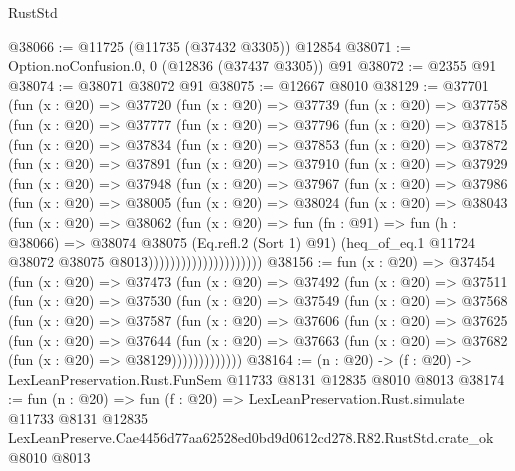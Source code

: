 \begin{lexlean}{RustStd}
\begin{coremodule}
@38066 := @11725 (@11735 (@37432 @3305)) @12854
@38071 := Option.noConfusion.{0, 0} (@12836 (@37437 @3305)) @91
@38072 := @2355 @91
@38074 := @38071 @38072 @91
@38075 := @12667 @8010
@38129 := @37701
    (fun (x : @20) =>
    @37720
      (fun (x : @20) =>
      @37739
        (fun (x : @20) =>
        @37758
          (fun (x : @20) =>
          @37777
            (fun (x : @20) =>
            @37796
              (fun (x : @20) =>
              @37815
                (fun (x : @20) =>
                @37834
                  (fun (x : @20) =>
                  @37853
                    (fun (x : @20) =>
                    @37872
                      (fun (x : @20) =>
                      @37891
                        (fun (x : @20) =>
                        @37910
                          (fun (x : @20) =>
                          @37929
                            (fun (x : @20) =>
                            @37948
                              (fun (x : @20) =>
                              @37967
                                (fun (x : @20) =>
                                @37986
                                  (fun (x : @20) =>
                                  @38005
                                    (fun (x : @20) =>
                                    @38024
                                      (fun (x : @20) =>
                                      @38043
                                        (fun (x : @20) =>
                                        @38062
                                          (fun (x : @20) =>
                                          fun (fn : @91) =>
                                          fun (h : @38066) =>
                                          @38074
                                            @38075
                                            (Eq.refl.{2} (Sort 1) @91)
                                            (heq_of_eq.{1}
                                              @11724
                                              @38072
                                              @38075
                                              @8013)))))))))))))))))))))
@38156 := fun (x : @20) =>
  @37454
    (fun (x : @20) =>
    @37473
      (fun (x : @20) =>
      @37492
        (fun (x : @20) =>
        @37511
          (fun (x : @20) =>
          @37530
            (fun (x : @20) =>
            @37549
              (fun (x : @20) =>
              @37568
                (fun (x : @20) =>
                @37587
                  (fun (x : @20) =>
                  @37606
                    (fun (x : @20) =>
                    @37625
                      (fun (x : @20) =>
                      @37644
                        (fun (x : @20) =>
                        @37663 (fun (x : @20) => @37682 (fun (x : @20) => @38129)))))))))))))
@38164 := (n : @20) -> (f : @20) -> LexLeanPreservation.Rust.FunSem @11733 @8131 @12835 @8010 @8013
@38174 := fun (n : @20) =>
  fun (f : @20) =>
  LexLeanPreservation.Rust.simulate
    @11733
    @8131
    @12835
    LexLeanPreserve.Cae4456d77aa62528ed0bd9d0612cd278.R82.RustStd.crate_ok
    @8010
    @8013
\end{coremodule}
\end{lexlean}
